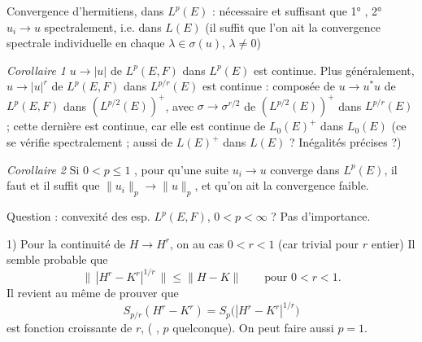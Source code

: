 \documentclass[11pt,a4paper]{article}
\begin{document}
Convergence d'hermitiens,   dans $L^p(E)$ :  nécessaire et suffisant que 1° , 2° $u_i \to u$ spectralement, i.e. dans $L(E)$  (il suffit \ill{} que l'on ait la convergence spectrale individuelle en chaque $\lambda \in \sigma(u)$, $\lambda \neq 0$)

\emph{Corollaire 1} $u \to |u|$ de $L^p(E, F)$ dans $L^p(E)$ est continue. Plus généralement, $u \to |u|^r$ de $L^p(E,F)$ dans $L^{p/r}(E)$ est continue :   composée de $u \to u^{*}u$ de $L^p(E,F)$ dans $(L^{p/2}(E))^{+}$, avec $\sigma \to \sigma^{r/2}$ de $(L^{p/2}(E))^{+}$ dans $L^{p/r}(E)$ ; cette dernière est continue, car elle est continue de $L_0(E)^{+}$ dans $L_0(E)$ (ce  se vérifie spectralement ;  aussi de $L(E)^{+}$ dans $L(E)$ ? Inégalités précises ?)

\emph{Corollaire 2} Si $0 < p \leq 1$ , pour qu'une suite  $u_i \to u$  converge dans $L^p(E)$, il faut et il suffit que $\|u_i\|_p \to \|u\|_p$, et qu'on ait la convergence faible.


Question :  convexité des esp. $L^p(E,F)$,  $0 < p < \infty$ ? Pas d'importance. 

1) Pour la continuité de $H \to H^r$, on  au cas $0 < r < 1$ (car  trivial pour $r$ entier) Il semble probable que
\[
  \bigl\|\,|H^r - K^r|^{1/r}\,\bigr\| \leq \|H - K\| \qquad \text{pour } 0 < r < 1 .
\]
Il revient au même de prouver que
\[
  S_{p/r}(H^r - K^r) = S_p\bigl(|H^r - K^r|^{1/r}\bigr)
\]
est fonction croissante de $r$, (  \ill{} \ill{}, $p$ quelconque). On peut faire aussi $p = 1$.
\end{document}
